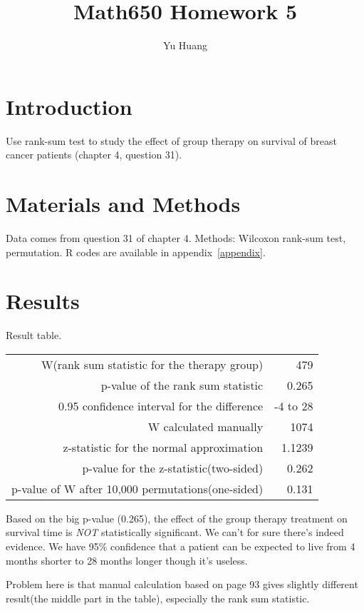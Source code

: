 \documentclass[a4paper,10pt]{article}
\title{Math650 Homework 5}
\author{Yu Huang}
\begin{document}
\maketitle

\begin{abstract}

\end{abstract}


\section{Introduction}
Use rank-sum test to study the effect of group therapy on survival of breast cancer patients (chapter 4, question 31).

\section{Materials and Methods}
Data comes from question 31 of chapter 4. Methods: Wilcoxon rank-sum test, permutation. R codes are available in appendix~\ref{appendix}.

\section{Results}
Result table.

\begin{tabular}{|r|r|}
\hline
W(rank sum statistic for the therapy group) & 479\\
p-value of the rank sum statistic & 0.265 \\
0.95 confidence interval for the difference & -4 to 28\\
\hline
W calculated manually & 1074 \\
z-statistic for the normal approximation & 1.1239\\
p-value for the z-statistic(two-sided) & 0.262\\
\hline
p-value of W after 10,000 permutations(one-sided) & 0.131\\
\hline
\end{tabular}

Based on the big p-value (0.265), the effect of the group therapy treatment on survival time is \emph{NOT} statistically significant. We can't for sure there's indeed evidence. We have 95\% confidence that a patient can be expected to live from 4 months shorter to 28 months longer though it's useless.

Problem here is that manual calculation based on page 93 gives slightly different result(the middle part in the table), especially the rank sum statistic.
\end{document}
